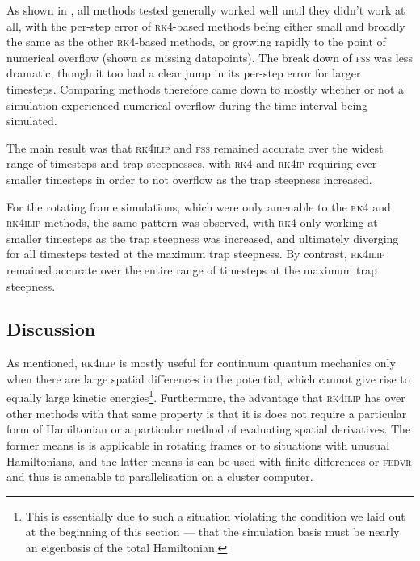 As shown in , all methods tested generally worked well until they didn't work at all, with the per-step error of \textsc{rk4}-based methods being either small and broadly the same as the other \textsc{rk4}-based methods, or growing rapidly to the point of numerical overflow (shown as missing datapoints). The break down of \textsc{fss} was less dramatic, though it too had a clear jump in its per-step error for larger timesteps. Comparing methods therefore came down to mostly whether or not a simulation experienced numerical overflow during the time interval being simulated.

The main result was that \textsc{rk4ilip} and \textsc{fss} remained accurate over the widest range of timesteps and trap steepnesses, with \textsc{rk4} and \textsc{rk4ip} requiring ever smaller timesteps in order to not overflow as the trap steepness increased.

For the rotating frame simulations, which were only amenable to the \textsc{rk4} and \textsc{rk4ilip} methods, the same pattern was observed, with \textsc{rk4} only working at smaller timesteps as the trap steepness was increased, and ultimately diverging for all timesteps tested at the maximum trap steepness. By contrast, \textsc{rk4ilip} remained accurate over the entire range of timesteps at the maximum trap steepness.

\subsection{Discussion}

As mentioned, \textsc{rk4ilip} is mostly useful for continuum quantum mechanics only when there are large spatial differences in the potential, which cannot give rise to equally large kinetic energies\footnote{This is essentially due to such a situation violating the condition we laid out at the beginning of this section --- that the simulation basis must be nearly an eigenbasis of the total Hamiltonian.}. Furthermore, the advantage that \textsc{rk4ilip} has over other methods with that same property is that it is does not require a particular form of Hamiltonian or a particular method of evaluating spatial derivatives. The former means is is applicable in rotating frames or to situations with unusual Hamiltonians, and the latter means is can be used with finite differences or \textsc{fedvr} \cite{schneider_parallel_2006} and thus is amenable to parallelisation on a cluster computer.

